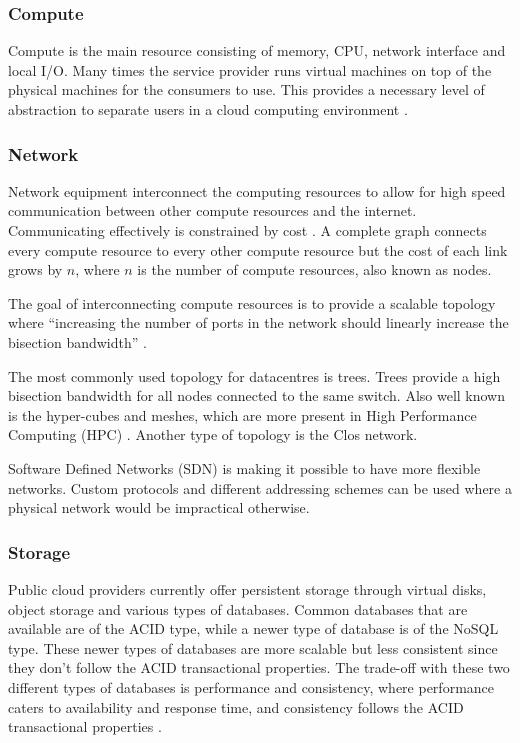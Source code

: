 \documentclass[12pt]{article}
\begin{document}
\subsubsection{Compute} \label{ssub:compute}

Compute is the main resource consisting of memory, CPU, network interface and local I/O. Many times the service provider runs virtual machines on top of the physical machines for the consumers to use. This provides a necessary level of abstraction to separate users in a cloud computing environment \cite{Jennings2015}.

\subsubsection{Network} \label{ssub:network}

Network equipment interconnect the computing resources to allow for high speed communication between other compute resources and the internet. Communicating effectively is constrained by cost \cite{Jennings2015}. A complete graph connects every compute resource to every other compute resource but the cost of each link grows by $n$, where $n$ is the number of compute resources, also known as nodes.

The goal of interconnecting compute resources is to provide a scalable topology where ``increasing the number of ports in the network should linearly increase the bisection bandwidth'' \cite{abts2012guided}.

The most commonly used topology for datacentres is trees. Trees provide a high bisection bandwidth for all nodes connected to the same switch. Also well known is the hyper-cubes and meshes, which are more present in High Performance Computing (HPC) \cite{Jennings2015}. Another type of topology is the Clos network. %

Software Defined Networks (SDN) is making it possible to have more flexible networks. Custom protocols and different addressing schemes can be used where a physical network would be impractical otherwise.

\subsubsection{Storage} \label{ssub:storage}


Public cloud providers currently offer persistent storage through virtual disks, object storage and various types of databases. Common databases that are available are of the ACID type, while a newer type of database is of the NoSQL type. These newer types of databases are more scalable but less consistent since they don't follow the ACID transactional properties. The trade-off with these two different types of databases is performance and consistency, where performance caters to availability and response time, and consistency follows the ACID transactional properties \cite{Jennings2015}.
\end{document}
